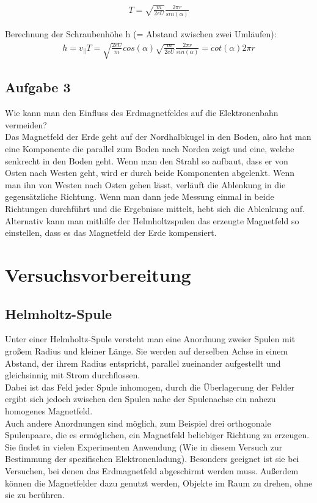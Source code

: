 \documentclass[a4paper,10pt]{scrartcl}
\begin{document}
	
	
	\begin{align}
	T=\sqrt{\frac{m}{2eU}}\frac{2\pi r}{sin(\alpha)}
	\end{align}
	
	\newpage
	
	Berechnung der Schraubenhöhe h (= Abstand zwischen zwei Umläufen):
	\begin{align}
	h=v_{\parallel}T=\sqrt{\frac{2eU}{m}}cos(\alpha)\sqrt{\frac{m}{2eU}}\frac{2\pi r}{sin(\alpha)}=cot(\alpha)2\pi r
	\end{align}
	
	\subsection{Aufgabe 3}
	
	Wie kann man den Einfluss des Erdmagnetfeldes auf die Elektronenbahn vermeiden?\\
	Das Magnetfeld der Erde geht auf der Nordhalbkugel in den Boden, also hat man eine Komponente die parallel zum Boden nach Norden zeigt und eine, welche senkrecht in den Boden geht. Wenn man den Strahl so aufbaut, dass er von Osten nach Westen geht, wird er durch beide Komponenten abgelenkt. Wenn man ihn von Westen nach Osten gehen lässt, verläuft die Ablenkung in die gegensätzliche Richtung. Wenn man dann jede Messung einmal in beide Richtungen durchführt und die Ergebnisse mittelt, hebt sich die Ablenkung auf.\\
	Alternativ kann man mithilfe der Helmholtzspulen das erzeugte Magnetfeld so einstellen, dass es das Magnetfeld der Erde kompensiert.
	\newpage
	\section{Versuchsvorbereitung}
	\subsection{Helmholtz-Spule}
	Unter einer Helmholtz-Spule versteht man eine Anordnung zweier Spulen mit großem Radius und kleiner Länge. Sie werden auf derselben Achse in einem Abstand, der ihrem Radius entspricht, parallel zueinander aufgestellt und gleichsinnig mit Strom durchflossen.\\
	Dabei ist das Feld jeder Spule inhomogen, durch die Überlagerung der Felder ergibt sich jedoch zwischen den Spulen nahe der Spulenachse ein nahezu homogenes Magnetfeld.\\
	Auch andere Anordnungen sind möglich, zum Beispiel drei orthogonale Spulenpaare, die es ermöglichen, ein Magnetfeld beliebiger Richtung zu erzeugen. Sie findet in vielen Experimenten Anwendung (Wie in diesem Versuch zur Bestimmung der spezifischen Elektronenladung). Besonders geeignet ist sie bei Versuchen, bei denen das Erdmagnetfeld abgeschirmt werden muss. Außerdem können die Magnetfelder dazu genutzt werden, Objekte im Raum zu drehen, ohne sie zu berühren.
\end{document}
